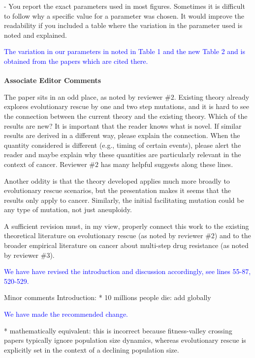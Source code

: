 \documentclass[12pt]{extarticle}
\begin{document}
- You report the exact parameters used in most figures. Sometimes it is difficult to follow why a specific value for a parameter was chosen. It would improve the readability if you included a table where the variation in the parameter used is noted and explained.

\textcolor{blue}{The variation in our parameters in noted in Table 1 and the new Table 2 and is obtained from the papers which are cited there.} 
\\\\
\textbf{Associate Editor Comments}

The paper sits in an odd place, as noted by reviewer $\#2$. Existing theory already explores evolutionary rescue by one and two step mutations, and it is hard to see the connection between the current theory and the existing theory. Which of the results are new? It is important that the reader knows what is novel. If similar results are derived in a different way, please explain the connection. When the quantity considered is different (e.g., timing of certain events), please alert the reader and maybe explain why these quantities are particularly relevant in the context of cancer. Reviewer $\#2$ has many helpful suggests along these lines.

Another oddity is that the theory developed applies much more broadly to evolutionary rescue scenarios, but the presentation makes it seems that the results only apply to cancer. Similarly, the initial facilitating mutation could be any type of mutation, not just aneuploidy.

A sufficient revision must, in my view, properly connect this work to the existing theoretical literature on evolutionary rescue (as noted by reviewer $\#2$) and to the broader empirical literature on cancer about multi-step drug resistance (as noted by reviewer $\#3$).

\textcolor{blue}{
We have have revised the introduction and discussion accordingly, see lines 55-87, 520-529.
}

Minor comments
Introduction:
* 10 millions people die: add globally

\textcolor{blue}{We have made the recommended change. }  %

* mathematically equivalent: this is incorrect because fitness-valley crossing papers typically ignore population size dynamics, whereas evolutionary rescue is explicitly set in the context of a declining population size.
\end{document}
